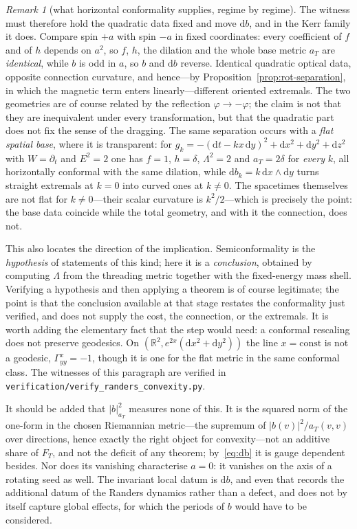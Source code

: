 \documentclass[12pt]{iopart}
\theoremstyle{plain}
\theoremstyle{definition}
\theoremstyle{remark}
\newtheorem{remark}[proposition]{Remark}
\newcommand{\dd}{\mathrm{d}}
\begin{document}
\begin{remark}[what horizontal conformality supplies, regime by regime]
The witness must therefore hold the quadratic data fixed and move $\dd b$, and
in the Kerr family it does. Compare spin $+a$ with spin $-a$ in fixed
coordinates: every coefficient of $f$ and of $h$ depends on $a^2$, so $f$, $h$,
the dilation and the whole base metric $a_T$ are \emph{identical}, while $b$ is
odd in $a$, so $b$ and $\dd b$ reverse. Identical quadratic optical data,
opposite connection curvature, and hence---by
Proposition~\ref{prop:rot-separation}, in which the magnetic term enters
linearly---different oriented extremals. The two geometries are of course
related by the reflection $\varphi\to-\varphi$; the claim is not that they are
inequivalent under every transformation, but that the quadratic part does not
fix the sense of the dragging. The same separation occurs with a \emph{flat
spatial base}, where it is transparent: for
$g_k=-(\dd t-kx\,\dd y)^2+\dd x^2+\dd y^2+\dd z^2$ with $W=\partial_t$ and
$E^2=2$ one has $f=1$, $h=\delta$, $\Lambda^2=2$ and $a_T=2\delta$ for
\emph{every} $k$, all horizontally conformal with the same dilation, while
$\dd b_k=k\,\dd x\wedge\dd y$ turns straight extremals at $k=0$ into curved ones
at $k\neq0$. The spacetimes themselves are not flat for $k\neq0$---their scalar
curvature is $k^2/2$---which is precisely the point: the base data coincide while
the total geometry, and with it the connection, does not.

This also locates the direction of the implication. Semiconformality is the
\emph{hypothesis} of statements of this kind; here it is a \emph{conclusion},
obtained by computing $\Lambda$ from the threading metric together with the
fixed-energy mass shell. Verifying a hypothesis and then applying a theorem is of
course legitimate; the point is that the conclusion available at that stage
restates the conformality just verified, and does not supply the cost, the
connection, or the extremals. It is worth adding the elementary fact that the
step would need: a conformal rescaling does not preserve geodesics. On
$(\mathbb R^2,e^{2x}(\dd x^2+\dd y^2))$ the line $x=\mathrm{const}$ is not a
geodesic, $\Gamma^x_{yy}=-1$, though it is one for the flat metric in the same
conformal class. The witnesses of this paragraph are verified in
\texttt{verification/verify\_randers\_convexity.py}.

It should be added that $|b|^2_{a_T}$ measures none of this. It is the squared
norm of the one-form in the chosen Riemannian metric---the supremum of
$|b(v)|^2/a_T(v,v)$ over directions, hence exactly the right object for
convexity---not an additive share of $F_T$, and not the deficit of any theorem;
by~\eqref{eq:db} it is gauge dependent besides. Nor does its vanishing
characterise $a=0$: it vanishes on the axis of a rotating seed as well. The
invariant local datum is $\dd b$, and even that records the additional datum of
the Randers dynamics rather than a defect, and does not by itself capture global
effects, for which the periods of $b$ would have to be considered.
\end{remark}
\end{document}
